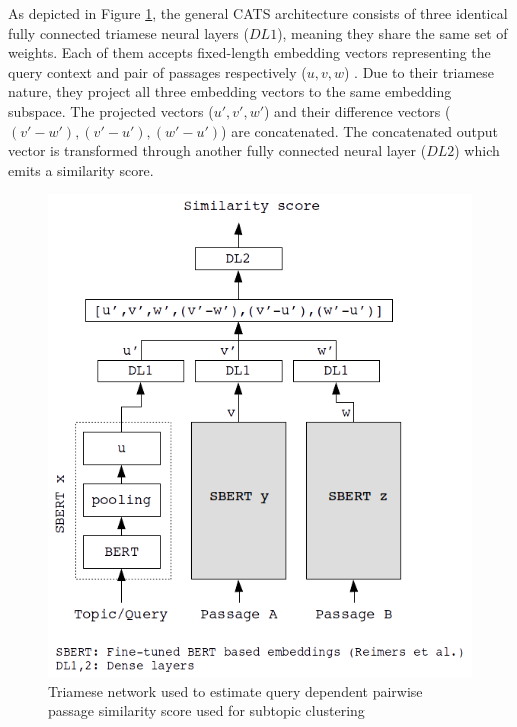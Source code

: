 As depicted in Figure \ref{fig:triam}, the general CATS architecture consists of three identical fully connected triamese neural layers ($DL1$), meaning they share the same set of weights. Each of them accepts fixed-length embedding vectors representing the query context and pair of passages respectively ($u,v,w$) . Due to their triamese nature, they project all three embedding vectors to the same embedding subspace. The projected vectors ($u',v',w'$) and their difference vectors ($(v'-w'),(v'-u'),(w'-u')$) are concatenated. The concatenated output vector is transformed through another fully connected neural layer ($DL2$) which emits a similarity score.
\begin{figure}[h]
  \centering
  \includegraphics[width=\linewidth]{graphics/triamese.png}
  \caption{Triamese network used to estimate query dependent pairwise passage similarity score used for subtopic clustering}
  \label{fig:triam}
\end{figure}

